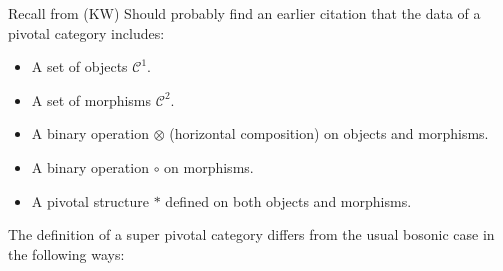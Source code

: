 \documentclass[12pt,a4paper]{article}
\newcommand{\tp}{\otimes}
\newcommand{\mcc}{\mathcal{C}}
\newcommand{\kw}[1]{{\color{kwcolor}\footnotesize{(KW) #1}}}
\newcommand{\dave}[1]{{\color{ao(english)}\footnotesize{(DA) #1}}}
\newcommand{\ethan}[1]{{\color{amethyst}\footnotesize{(EL) #1}}}
\begin{document}
Recall from 
\cite{kitaev2006}
\kw{Should probably find an earlier citation}
that the data of a pivotal category includes:
\begin{itemize}
\item A set of objects $\mcc^1$.
\item A set of morphisms $\mcc^2$.
\item A binary operation $\otimes$ (horizontal composition) on objects and morphisms.
\item A binary operation $\circ$ on morphisms.
\item A pivotal structure $*$ defined on both objects and morphisms.
\end{itemize}


The definition of a super pivotal category differs from the usual bosonic case in the following ways:
\end{document}
